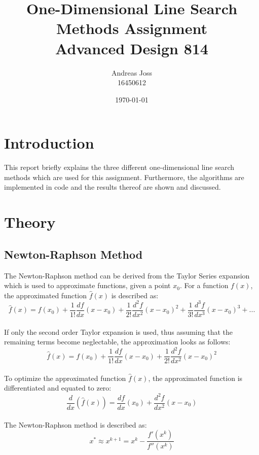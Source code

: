 \documentclass[a4paper,10pt]{article}
\title{\Huge{One-Dimensional Line Search Methods Assignment}\\[7cm]Advanced Design 814\\[2cm]}
\author{\Large Andreas Joss\\[0.5cm]16450612}
\date{\today}
\begin{document}
\maketitle


\newpage
\section{Introduction}
This report briefly explains the  three different one-dimensional line search methods which are used for this assignment. Furthermore, the algorithms are implemented in code and the results thereof are shown and discussed. 

\section{Theory}
\subsection{Newton-Raphson Method}
The Newton-Raphson method can be derived from the Taylor Series expansion which is used to approximate functions, given a point $x_{0}$. For a function $f(x)$, the approximated function $\hat{f}(x)$ is described as:
 \begin{equation}\label{eq:1}
  \hat{f}(x) = f(x_{0}) + \frac{1}{1!} \frac{df}{dx}({x-x_{0}}) + \frac{1}{2!} \frac{d^{2}f}{dx^{2}}(x-x_{0})^{2} + \frac{1}{3!} \frac{d^{3}f}{dx^{3}}(x-x_{0})^{3} +  . . . 
 \end{equation}
\\[0.5cm]

If only the second order Taylor expansion is used, thus assuming that the remaining terms become neglectable, the approximation looks as follows:
 \begin{equation}\label{eq:2}
  \hat{f}(x) = f(x_{0}) + \frac{1}{1!} \frac{df}{dx}({x-x_{0}}) + \frac{1}{2!} \frac{d^{2}f}{dx^{2}}(x-x_{0})^{2}
 \end{equation}
\\[0.5cm]

To optimize the approximated function $\hat{f}(x)$, the approximated function is differentiated and equated to zero:
 \begin{equation}\label{eq:3}
  \frac{d}{dx}(\hat{f}(x)) = \frac{df}{dx}(x_{0}) + \frac{d^{2}f}{dx^{2}}({x-x_{0}})
 \end{equation}
\\[0.5cm]

The Newton-Raphson method is described as:
 \begin{equation}\label{eq:4}
  x^{*} \approx x^{k+1} = x^{k} - \frac{f'(x^{k})}{f''(x^{k})}
 \end{equation}
\\[0.5cm]
\end{document}
